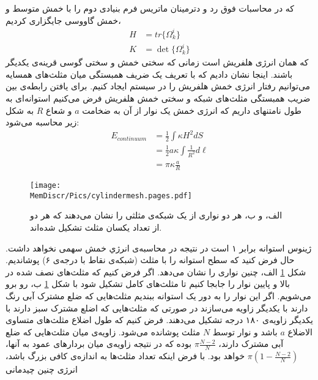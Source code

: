 که در محاسبات فوق رد
 و دترمینان ماتریس فرم بنیادی دوم را با خمش متوسط و خمش گاووسی جایگزاری کردیم،
\begin{equation}
\begin{aligned}
H&=tr\{\Omega_k^i\}\\
K&=\det\{\Omega_k^i\}
\end{aligned}
\end{equation} 
که همان انرژی هلفریش است زمانی که سختی خمش و سختی گوسی قرینه‌ی یکدیگر باشند. اینجا نشان دادیم که با تعریف یک ضریف همبستگی میان مثلث‌های همسایه می‌توانیم رفتار انرژی خمش هلفریش را در سیستم ایجاد کنیم. برای یافتن رابطه‌ی بین ضریب همبستگی مثلث‌های شبکه و سختی خمش هلفریش فرض می‌کنیم استوانه‌ای به طول نامتنهای داریم که انرژی خمش یک نوار از آن به ضخامت
$a$
و شعاع
$R$
به شکل زیر محاسبه می‌شود:
\begin{equation}
\begin{aligned}
E_{continuum}&=\frac{1}{2}\int \kappa H^2dS \\
&=\frac{1}{2}a\kappa\int \frac{1}{R^2}d\ell \\
&=\pi\kappa\frac{a}{R}
\end{aligned}
\label{eq:cylindercontinuum}
\end{equation} 

\begin{figure}[h]
\begin{center}
\texttt{[image: \\MemDiscr/Pics/cylindermesh.pages.pdf]}
\caption{
الف، و ب، هر دو نواری از یک شبکه‌ی مثلثی را نشان می‌دهند که هر دو از تعداد یکسان مثلث تشکیل شده‌اند. 
}
\label{fig:cylindermesh}
\end{center}
\end{figure}



ژینوس استوانه برابر ۱ است در نتیجه‌ در محاسبه‌ی انرژي خمش سهمی نخواهد داشت. حال فرض کنید که سطح استوانه را با مثلث (شبکه‌ی نقاط با درجه‌ی ۶) پوشاندیم. شکل
\ref{fig:cylindermesh}
الف، چنین نواری را نشان می‌دهد. اگر فرض کنیم که مثلث‌های نصف شده در بالا و پایین نوار را جابجا کنیم تا مثلث‌های کامل تشکیل شود با شکل
\ref{fig:cylindermesh}
ب، رو برو می‌شویم. اگر این نوار را به دور یک استوانه ببندیم مثلث‌هایی که ضلع مشترک آبی رنگ دارند با یکدیگر زاویه می‌سازند در صورتی که مثلث‌هایی که اضلع مشترک  سبز دارند با یکدیگر زاویه‌ی ۱۸۰ درجه تشکیل می‌دهند. فرض کنیم که طول اضلاع مثلث‌های متساوی الاضلاع 
$a$
 باشد و نوار توسط 
 $N$
 مثلث پوشانده می‌شود. زاویه‌ی میان مثلث‌هایی که ضلع آبی مشترک دارند،
 $\pi\frac{N-2}{N}$
بوده که در نتیجه زاویه‌ی میان بردار‌های عمود به آنها،
 $\pi(1-\frac{N-2}{N})$
خواهد بود. با فرض اینکه تعداد مثلث‌ها به اندازه‌ی کافی بزرگ باشد، انرژی چنین چیدمانی

